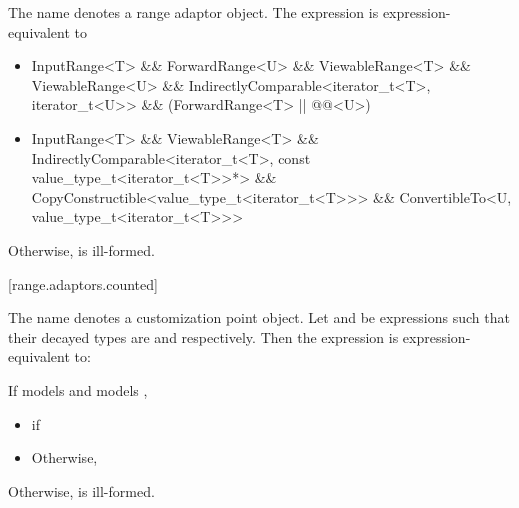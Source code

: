 \pnum
The name  denotes a range adaptor
object.
 The expression
  is expression-equivalent to 
{\color{oldclr}
\begin{itemize}
\item \begin{codeblock}
InputRange<T> && ForwardRange<U> &&
ViewableRange<T> && ViewableRange<U> &&
IndirectlyComparable<iterator_t<T>, iterator_t<U>> &&
(ForwardRange<T> || @@<U>)
\end{codeblock}

\item \begin{codeblock}
InputRange<T> && ViewableRange<T> &&
IndirectlyComparable<iterator_t<T>, const value_type_t<iterator_t<T>>*> &&
CopyConstructible<value_type_t<iterator_t<T>>> &&
ConvertibleTo<U, value_type_t<iterator_t<T>>>
\end{codeblock}
\end{itemize}
Otherwise,  is ill-formed.
} %


[range.adaptors.counted]{}

\pnum
The name  denotes a customization point
object.
Let  and  be expressions such that their decayed types are 
and  respectively. Then the expression  is
expression-equivalent to:

\begin{itemize}
{\color{newclr}
\item If  models  and  models
,
} %
  \begin{itemize}
  \item {} if   

  \item Otherwise,  
\end{itemize}

\item Otherwise,  is ill-formed.
\end{itemize}

